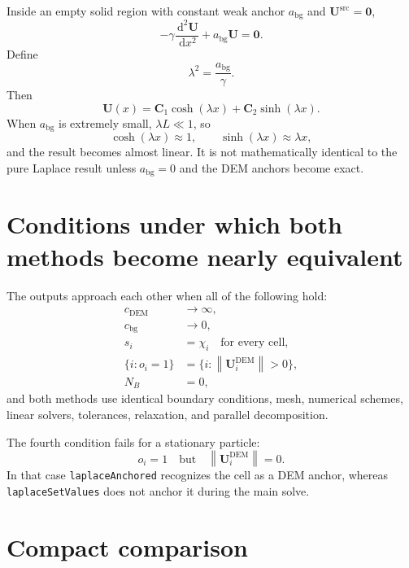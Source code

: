 \documentclass[11pt,a4paper]{article}
\newcommand{\U}{\bm{U}}
\newcommand{\Ud}{\bm{U}^{\mathrm{DEM}}}
\newcommand{\Usrc}{\bm{U}^{\mathrm{src}}}
\newcommand{\norm}[1]{\left\lVert #1\right\rVert}
\newcommand{\dd}{\,\mathrm{d}}
\begin{document}
Inside an empty solid region with constant weak anchor $a_{\mathrm{bg}}$ and
$\Usrc=\bm0$,
\[
-\gamma\frac{\dd^2\U}{\dd x^2}
+a_{\mathrm{bg}}\U
=
\bm0.
\]
Define
\[
\lambda^2=\frac{a_{\mathrm{bg}}}{\gamma}.
\]
Then
\[
\U(x)
=
\bm C_1\cosh(\lambda x)
+
\bm C_2\sinh(\lambda x).
\]
When $a_{\mathrm{bg}}$ is extremely small,
$\lambda L\ll1$, so
\[
\cosh(\lambda x)\approx1,
\qquad
\sinh(\lambda x)\approx\lambda x,
\]
and the result becomes almost linear. It is not mathematically identical to
the pure Laplace result unless $a_{\mathrm{bg}}=0$ and the DEM anchors become exact.

\section{Conditions under which both methods become nearly equivalent}

The outputs approach each other when all of the following hold:
\begin{align}
c_{\mathrm{DEM}}&\rightarrow\infty,\\
c_{\mathrm{bg}}&\rightarrow0,\\
s_i&=\chi_i\quad\text{for every cell},\\
\{i:o_i=1\}&=\{i:\norm{\Ud_i}>0\},\\
N_B&=0,
\end{align}
and both methods use identical boundary conditions, mesh, numerical schemes,
linear solvers, tolerances, relaxation, and parallel decomposition.

The fourth condition fails for a stationary particle:
\[
o_i=1
\quad\text{but}\quad
\norm{\Ud_i}=0.
\]
In that case \texttt{laplaceAnchored} recognizes the cell as a DEM anchor, whereas
\texttt{laplaceSetValues} does not anchor it during the main solve.

\section{Compact comparison}
\end{document}
